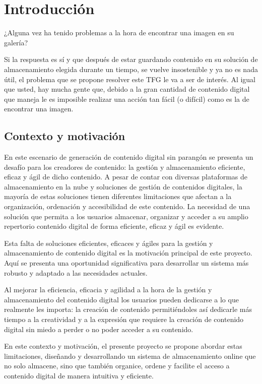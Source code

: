 \chapter{Introducción}

¿Alguna vez ha tenido problemas a la hora de encontrar una imagen en su galería?

Si la respuesta es sí y que después de estar guardando contenido en su solución de almacenamiento elegida durante un tiempo, se vuelve insostenible y ya no es nada útil, el problema que se propone resolver este TFG le va a ser de interés. Al igual que usted, hay mucha gente que, debido a la gran cantidad de contenido digital que maneja le es imposible realizar una acción tan fácil (o difícil) como es la de encontrar una imagen.

\section{Contexto y motivación}

En este escenario de generación de contenido digital sin parangón se presenta un desafío para los creadores de contenido: la gestión y almacenamiento eficiente, eficaz
y ágil de dicho contenido. A pesar de contar con diversas plataformas de almacenamiento en la nube y soluciones de gestión de contenidos digitales, la mayoría de
estas soluciones tienen diferentes limitaciones que afectan a la organización, ordenación y accesibilidad de este contenido. La necesidad de una solución que permita
a los usuarios almacenar, organizar y acceder a su amplio repertorio contenido digital de forma eficiente, eficaz y ágil es evidente.

Esta falta de soluciones eficientes, eficaces y ágiles para la gestión y almacenamiento de contenido digital es la motivación principal de este proyecto. Aquí se
presenta una oportunidad significativa para desarrollar un sistema más robusto y adaptado a las necesidades actuales.

Al mejorar la eficiencia, eficacia y agilidad a la hora de la gestión y almacenamiento del contenido digital los usuarios pueden dedicarse a lo que realmente les importa:
la creación de contenido permitiéndoles así dedicarle más tiempo a la creatividad y a la expresión que requiere la creación de contenido digital sin miedo a perder o
no poder acceder a su contenido.

En este contexto y motivación, el presente proyecto se propone abordar estas limitaciones, diseñando y desarrollando un sistema de almacenamiento online que no solo almacene, 
sino que también organice, ordene y facilite el acceso a contenido digital de manera intuitiva y eficiente.

